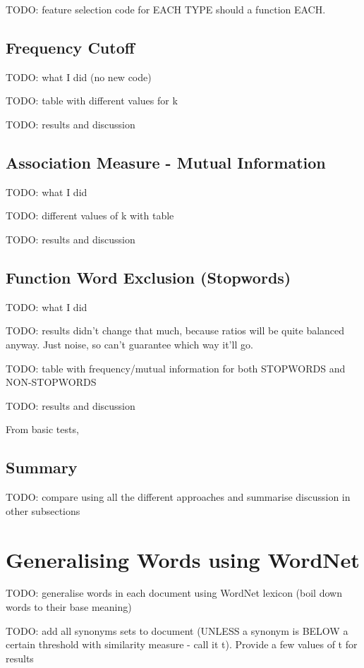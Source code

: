 \documentclass{article}
\begin{document}
TODO: feature selection code for EACH TYPE should a function EACH. 

\subsection{Frequency Cutoff}

TODO: what I did (no new code)

TODO: table with different values for k

TODO: results and discussion

\subsection{Association Measure - Mutual Information}

TODO: what I did

TODO: different values of k with table

TODO: results and discussion

\subsection{Function Word Exclusion (Stopwords)}

TODO: what I did

TODO: results didn't change that much, because ratios will be quite balanced anyway. Just noise, so can't guarantee which way it'll go.

TODO: table with frequency/mutual information for both STOPWORDS and NON-STOPWORDS

TODO: results and discussion

From basic tests,

\subsection{Summary}

TODO: compare using all the different approaches and summarise discussion in other subsections

\section{Generalising Words using WordNet}

TODO: generalise words in each document using WordNet lexicon (boil down words to their base meaning)

TODO: add all synonyms sets to document (UNLESS a synonym is BELOW a certain threshold with similarity measure - call it t). Provide a few values of t for results
\end{document}
